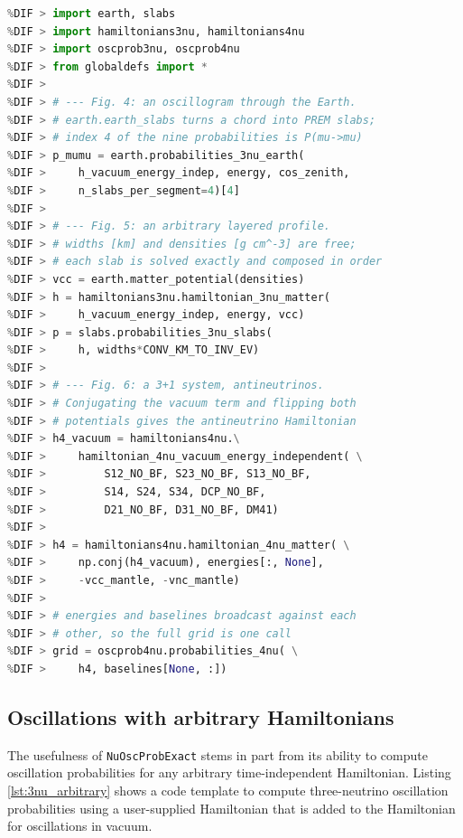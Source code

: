 \documentclass[final,5p,times,twocolumn]{elsarticle}
\providecommand{\DIFaddend}{} %
\providecommand{\DIFmodbegin}{} %
\providecommand{\DIFmodend}{} %
\begin{document}
\DIFmodbegin
\begin{lstlisting}[language=Python, caption={Producing Figures\ \ref{fig:earth_oscillogram}, \ref{fig:density_arrangement}, and \ref{fig:sterile_earth}.  In each case the whole grid or scan is a single call: the routines broadcast over stacks of Hamiltonians and arrays of baselines.  The full versions, with the plotting, are in {\tt notebooks/10\_paper\_figures.ipynb}.}, label={lst:figures}, float,alsolanguage=DIFcode]
%DIF > import numpy as np
%DIF > import earth, slabs
%DIF > import hamiltonians3nu, hamiltonians4nu
%DIF > import oscprob3nu, oscprob4nu
%DIF > from globaldefs import *
%DIF > 
%DIF > # --- Fig. 4: an oscillogram through the Earth.
%DIF > # earth.earth_slabs turns a chord into PREM slabs;
%DIF > # index 4 of the nine probabilities is P(mu->mu)
%DIF > p_mumu = earth.probabilities_3nu_earth(
%DIF >     h_vacuum_energy_indep, energy, cos_zenith,
%DIF >     n_slabs_per_segment=4)[4]
%DIF > 
%DIF > # --- Fig. 5: an arbitrary layered profile.
%DIF > # widths [km] and densities [g cm^-3] are free;
%DIF > # each slab is solved exactly and composed in order
%DIF > vcc = earth.matter_potential(densities)
%DIF > h = hamiltonians3nu.hamiltonian_3nu_matter(
%DIF >     h_vacuum_energy_indep, energy, vcc)
%DIF > p = slabs.probabilities_3nu_slabs(
%DIF >     h, widths*CONV_KM_TO_INV_EV)
%DIF > 
%DIF > # --- Fig. 6: a 3+1 system, antineutrinos.
%DIF > # Conjugating the vacuum term and flipping both
%DIF > # potentials gives the antineutrino Hamiltonian
%DIF > h4_vacuum = hamiltonians4nu.\
%DIF >     hamiltonian_4nu_vacuum_energy_independent( \
%DIF >         S12_NO_BF, S23_NO_BF, S13_NO_BF,
%DIF >         S14, S24, S34, DCP_NO_BF,
%DIF >         D21_NO_BF, D31_NO_BF, DM41)
%DIF > 
%DIF > h4 = hamiltonians4nu.hamiltonian_4nu_matter( \
%DIF >     np.conj(h4_vacuum), energies[:, None],
%DIF >     -vcc_mantle, -vnc_mantle)
%DIF > 
%DIF > # energies and baselines broadcast against each
%DIF > # other, so the full grid is one call
%DIF > grid = oscprob4nu.probabilities_4nu( \
%DIF >     h4, baselines[None, :])
\end{lstlisting}
\DIFmodend

\DIFaddend \subsection{Oscillations with arbitrary Hamiltonians}

The usefulness of {\tt NuOscProbExact} stems in part from its ability to compute oscillation probabilities for any arbitrary time-independent Hamiltonian.   Listing \ref{lst:3nu_arbitrary} shows a code template to compute three-neutrino oscillation probabilities using a user-supplied Hamiltonian that is added to the Hamiltonian for oscillations in vacuum.
\end{document}
